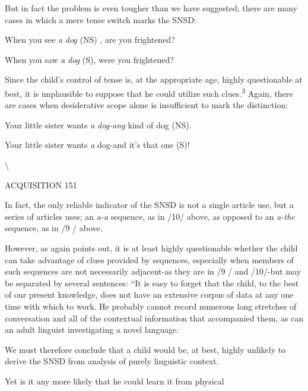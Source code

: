 But in fact the problem is even tougher than we have suggested; there are many cases in which a mere tense switch marks the SNSD:

\ea\label{ex:11}
 When you see \textit{a} \textit{dog} (NS) , are you frightened?
\glt
\z

\ea\label{ex:12}
 When you saw \textit{a} \textit{dog} (S), were you frightened?
\glt
\z

Since the child's control of tense is, at the appropriate age, highly questionable at best, it is implausible to suppose that he could utilize such clues.\textsuperscript{3} Again, there are cases when desiderative scope alone is insufficient to mark the distinction:

\ea\label{ex:13}
 Your little sister wants \textit{a} \textit{dog-any} kind of dog (NS).
\glt
\z

\ea\label{ex:14}
 Your little sister wants \textit{a} dog-and it's that one (S)!
\glt
\z

{\textbackslash}

ACQUISITION 151

In fact, the only reliable indicator of the SNSD is not a single article use, but a series of articles uses; an \textit{a-a }sequence, as in /10/ above, as opposed to an \textit{a-the} sequence, as in /9 / above.

However, as \citet[95]{Maratsos1976} again points out, it is at least highly questionable whether the child can take advantage of clues provided by sequences, especially when members of such sequences are not necessarily adjacent-as they are in /9 / and /10/-but may be separated by several sentences: ``It is easy to forget that the child, to the best of our present knowledge, does not have an extensive corpus of data at any one time with which to work. He probably cannot record numerous long stretches of conversation and all of the con\-textual information that accompanied them, as can an adult linguist investigating a novel language.{\textquotedbl}

We must therefore conclude that a child would be, at best, highly unlikely to derive the SNSD from analysis of purely linguistic context.

Yet is it any more likely that he could learn it from physical

